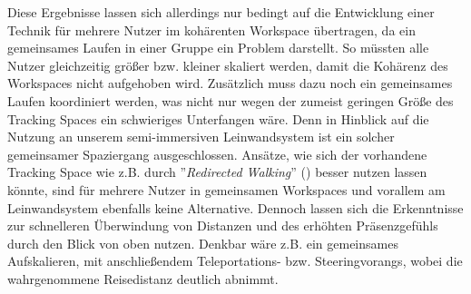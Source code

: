 Diese Ergebnisse lassen sich allerdings nur bedingt auf die Entwicklung einer Technik für mehrere Nutzer im kohärenten Workspace übertragen, da ein gemeinsames Laufen in einer Gruppe ein Problem darstellt. So müssten alle Nutzer gleichzeitig größer bzw. kleiner skaliert werden, damit die Kohärenz des Workspaces nicht aufgehoben wird. Zusätzlich muss dazu noch ein gemeinsames Laufen koordiniert werden, was nicht nur wegen der zumeist geringen Größe des Tracking Spaces ein schwieriges Unterfangen wäre. Denn in Hinblick auf die Nutzung an unserem semi-immersiven Leinwandsystem ist ein solcher gemeinsamer Spaziergang ausgeschlossen. Ansätze, wie sich der vorhandene Tracking Space wie z.B. durch ”\textit{Redirected Walking}” (\cite{RazzaqueRedirectedWalking}) besser nutzen lassen könnte, sind für mehrere Nutzer in gemeinsamen Workspaces und vorallem am Leinwandsystem ebenfalls keine Alternative. 
Dennoch lassen sich die Erkenntnisse zur schnelleren Überwindung von Distanzen und des erhöhten Präsenzgefühls durch den Blick von oben nutzen. Denkbar wäre z.B. ein gemeinsames Aufskalieren, mit anschließendem Teleportations- bzw. Steeringvorangs, wobei die wahrgenommene Reisedistanz deutlich abnimmt.

